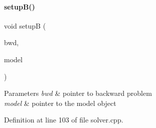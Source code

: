 \paragraph{\texorpdfstring{setupB()}{setupB()}}
{\footnotesize\ttfamily void setupB (\begin{DoxyParamCaption}\item[{\mbox{\hyperlink{classamici_1_1_backward_problem}{Backward\+Problem}} $\ast$}]{bwd,  }\item[{\mbox{\hyperlink{classamici_1_1_model}{Model}} $\ast$}]{model }\end{DoxyParamCaption})}


\begin{DoxyParams}{Parameters}
{\em bwd} & pointer to backward problem \\
\hline
{\em model} & pointer to the model object \\
\hline
\end{DoxyParams}


Definition at line 103 of file solver.\+cpp.

